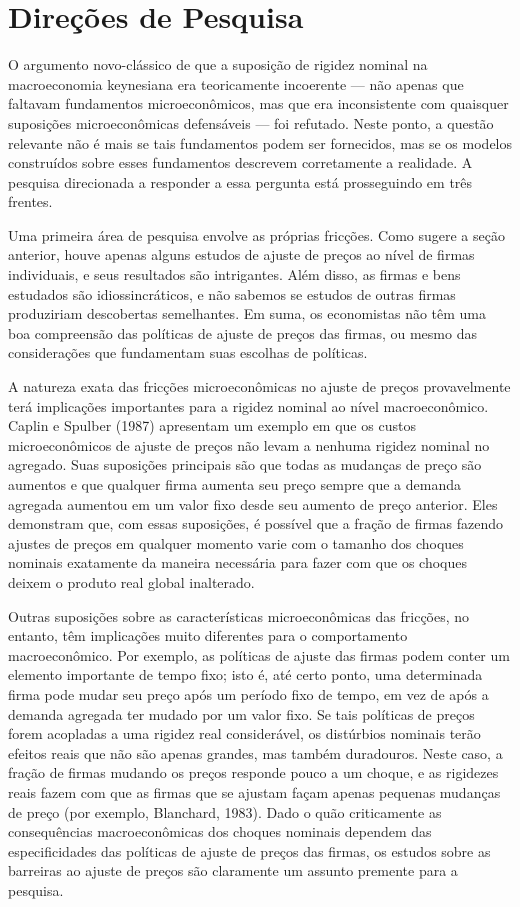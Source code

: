 \documentclass[12pt]{article}
\begin{document}
{\section*{Direções de Pesquisa}

O argumento novo-clássico de que a suposição de rigidez nominal na macroeconomia keynesiana era teoricamente incoerente — não apenas que faltavam fundamentos microeconômicos, mas que era inconsistente com quaisquer suposições microeconômicas defensáveis — foi refutado. Neste ponto, a questão relevante não é mais se tais fundamentos podem ser fornecidos, mas se os modelos construídos sobre esses fundamentos descrevem corretamente a realidade. A pesquisa direcionada a responder a essa pergunta está prosseguindo em três frentes.

Uma primeira área de pesquisa envolve as próprias fricções. Como sugere a seção anterior, houve apenas alguns estudos de ajuste de preços ao nível de firmas individuais, e seus resultados são intrigantes. Além disso, as firmas e bens estudados são idiossincráticos, e não sabemos se estudos de outras firmas produziriam descobertas semelhantes. Em suma, os economistas não têm uma boa compreensão das políticas de ajuste de preços das firmas, ou mesmo das considerações que fundamentam suas escolhas de políticas.

A natureza exata das fricções microeconômicas no ajuste de preços provavelmente terá implicações importantes para a rigidez nominal ao nível macroeconômico. Caplin e Spulber (1987) apresentam um exemplo em que os custos microeconômicos de ajuste de preços não levam a nenhuma rigidez nominal no agregado. Suas suposições principais são que todas as mudanças de preço são aumentos e que qualquer firma aumenta seu preço sempre que a demanda agregada aumentou em um valor fixo desde seu aumento de preço anterior. Eles demonstram que, com essas suposições, é possível que a fração de firmas fazendo ajustes de preços em qualquer momento varie com o tamanho dos choques nominais exatamente da maneira necessária para fazer com que os choques deixem o produto real global inalterado.

Outras suposições sobre as características microeconômicas das fricções, no entanto, têm implicações muito diferentes para o comportamento macroeconômico. Por exemplo, as políticas de ajuste das firmas podem conter um elemento importante de tempo fixo; isto é, até certo ponto, uma determinada firma pode mudar seu preço após um período fixo de tempo, em vez de após a demanda agregada ter mudado por um valor fixo. Se tais políticas de preços forem acopladas a uma rigidez real considerável, os distúrbios nominais terão efeitos reais que não são apenas grandes, mas também duradouros. Neste caso, a fração de firmas mudando os preços responde pouco a um choque, e as rigidezes reais fazem com que as firmas que se ajustam façam apenas pequenas mudanças de preço (por exemplo, Blanchard, 1983). Dado o quão criticamente as consequências macroeconômicas dos choques nominais dependem das especificidades das políticas de ajuste de preços das firmas, os estudos sobre as barreiras ao ajuste de preços são claramente um assunto premente para a pesquisa.

}
\end{document}
